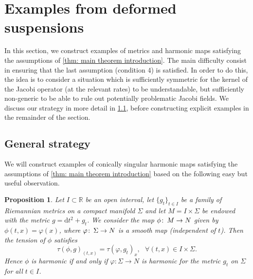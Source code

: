 \documentclass{article}
\numberwithin{equation}{section}        %
\theoremstyle{bfnote}
\newtheorem{prop}[thm]{Proposition}         %
\theoremstyle{definition}
\theoremstyle{bfremark}
\newcommand{\col}{\colon \thinspace}        %
\newcommand{\R}{\mathbb{R}}                 %
\newcommand{\diff}{\mathrm{d}}                      %
\begin{document}
    \section{Examples from deformed suspensions}        \label{sec: Examples from deformed suspensions}

In this section, we construct examples of metrics and harmonic maps satisfying the assumptions of \cref{thm: main theorem introduction}. The main difficulty consist in ensuring that the last assumption (condition 4) is satisfied. In order to do this, the idea is to consider a situation which is sufficiently symmetric for the kernel of the Jacobi operator (at the relevant rates) to be understandable, but sufficiently non-generic to be able to rule out potentially problematic Jacobi fields. We discuss our strategy in more detail in \cref{subsec: General stategy of examples}, before constructing explicit examples in the remainder of the section.

    \subsection{General strategy}       \label{subsec: General stategy of examples}

We will construct examples of conically singular harmonic maps satisfying the assumptions of \cref{thm: main theorem introduction} based on the following easy but useful observation.

\begin{prop}    \label{prop: t-independent harmonic maps on I x M}
    Let $I \subset \R$ be an open interval, let $\{g_t\}_{t \in I}$ be a family of Riemannian metrics on a compact manifold $\Sigma$ and let $M = I \times \Sigma$ be endowed with the metric $g = \diff t^2 + g_t$. We consider the map $\phi \col M \rightarrow N$ given by $\phi(t,x) = \varphi(x)$, where $\varphi \col \Sigma \rightarrow N$ is a smooth map (independent of $t$). Then the tension of $\phi$ satisfies
    \begin{equation*}
        \tau(\phi,g)_{(t,x)} = \tau(\varphi,g_t)_{x}, ~~~ \forall (t,x) \in I \times \Sigma.
    \end{equation*}
    Hence $\phi$ is harmonic if and only if $\varphi: \Sigma \rightarrow N$ is harmonic for the metric $g_t$ on $\Sigma$ for all $t \in I$.
\end{prop}
\end{document}
